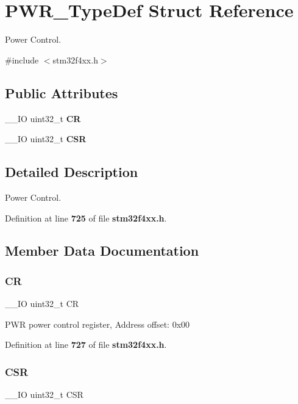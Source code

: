 \section{P\+W\+R\+\_\+\+Type\+Def Struct Reference}
\label{structPWR__TypeDef}


Power Control.  




{\ttfamily \#include $<$stm32f4xx.\+h$>$}

\subsection*{Public Attributes}
\begin{DoxyCompactItemize}
\item 
\+\_\+\+\_\+\+IO uint32\+\_\+t \textbf{ CR}
\item 
\+\_\+\+\_\+\+IO uint32\+\_\+t \textbf{ C\+SR}
\end{DoxyCompactItemize}


\subsection{Detailed Description}
Power Control. 

Definition at line \textbf{ 725} of file \textbf{ stm32f4xx.\+h}.



\subsection{Member Data Documentation}
\mbox{\label{structPWR__TypeDef_ab40c89c59391aaa9d9a8ec011dd0907a}} 
\subsubsection{CR}
{\footnotesize\ttfamily \+\_\+\+\_\+\+IO uint32\+\_\+t CR}

P\+WR power control register, Address offset\+: 0x00 

Definition at line \textbf{ 727} of file \textbf{ stm32f4xx.\+h}.

\mbox{\label{structPWR__TypeDef_a876dd0a8546697065f406b7543e27af2}} 
\subsubsection{C\+SR}
{\footnotesize\ttfamily \+\_\+\+\_\+\+IO uint32\+\_\+t C\+SR}

